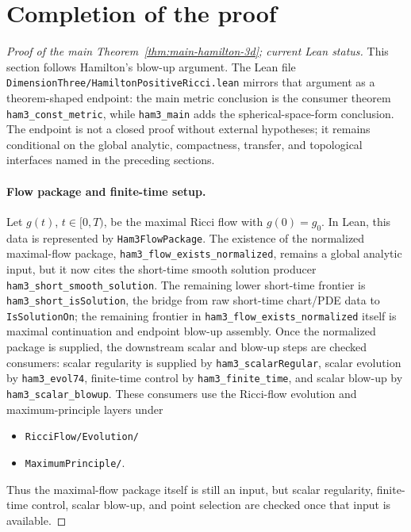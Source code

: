 \documentclass[11pt]{article}
\theoremstyle{plain}
\theoremstyle{definition}
\theoremstyle{remark}
\newcommand{\leanref}[1]{\nolinkurl{#1}}
\newcommand{\leanfile}[1]{\nolinkurl{#1}}
\newcommand{\rffile}[1]{\leanfile{#1}}
\newcommand{\rfdir}[1]{\leanfile{#1/}}
\begin{document}
\section{Completion of the proof}

\begin{proof}[Proof of the main Theorem~\ref{thm:main-hamilton-3d}; current Lean status]
This section follows Hamilton's blow-up argument.  The Lean file
\rffile{DimensionThree/HamiltonPositiveRicci.lean} mirrors that argument as a theorem-shaped
endpoint: the main metric conclusion is the consumer theorem
\leanref{ham3_const_metric}, while \leanref{ham3_main} adds the
spherical-space-form conclusion.  The endpoint is not a closed proof without
external hypotheses; it remains conditional on the global analytic,
compactness, transfer, and topological interfaces named in the preceding
sections.

\paragraph{Flow package and finite-time setup.}
Let $g(t)$, $t\in[0,T)$, be the maximal Ricci flow with $g(0)=g_0$.  In Lean,
this data is represented by \leanref{Ham3FlowPackage}.  The existence of the
normalized maximal-flow package, \leanref{ham3_flow_exists_normalized}, remains
a global analytic input, but it now cites the short-time smooth solution
producer \leanref{ham3_short_smooth_solution}.  The remaining lower short-time
frontier is \leanref{ham3_short_isSolution}, the bridge from raw short-time
chart/PDE data to \leanref{IsSolutionOn}; the remaining frontier in
\leanref{ham3_flow_exists_normalized} itself is maximal continuation and
endpoint blow-up assembly.  Once the normalized package is supplied, the
downstream scalar and blow-up steps are checked consumers: scalar regularity is
supplied by \leanref{ham3_scalarRegular}, scalar evolution by
\leanref{ham3_evol74}, finite-time control by \leanref{ham3_finite_time}, and
scalar blow-up by \leanref{ham3_scalar_blowup}.  These consumers use the
Ricci-flow evolution and maximum-principle layers under
\begin{itemize}[leftmargin=2em]
  \item \rfdir{RicciFlow/Evolution}
  \item \rfdir{MaximumPrinciple}.
\end{itemize}
Thus the maximal-flow package itself is still an input, but scalar regularity,
finite-time control, scalar blow-up, and point selection are checked once that
input is available.


\end{proof}
\end{document}
